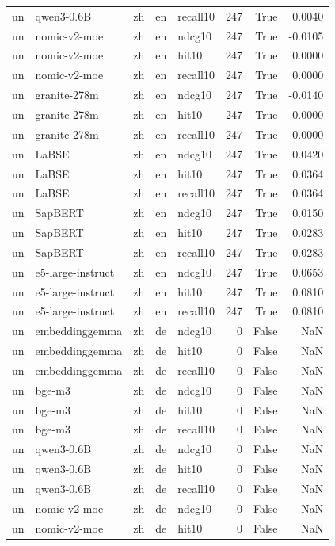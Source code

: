 \begin{tabular}{lllllrrr}
un & qwen3-0.6B & zh & en & recall10 & 247 & True & 0.0040 \\
un & nomic-v2-moe & zh & en & ndcg10 & 247 & True & -0.0105 \\
un & nomic-v2-moe & zh & en & hit10 & 247 & True & 0.0000 \\
un & nomic-v2-moe & zh & en & recall10 & 247 & True & 0.0000 \\
un & granite-278m & zh & en & ndcg10 & 247 & True & -0.0140 \\
un & granite-278m & zh & en & hit10 & 247 & True & 0.0000 \\
un & granite-278m & zh & en & recall10 & 247 & True & 0.0000 \\
un & LaBSE & zh & en & ndcg10 & 247 & True & 0.0420 \\
un & LaBSE & zh & en & hit10 & 247 & True & 0.0364 \\
un & LaBSE & zh & en & recall10 & 247 & True & 0.0364 \\
un & SapBERT & zh & en & ndcg10 & 247 & True & 0.0150 \\
un & SapBERT & zh & en & hit10 & 247 & True & 0.0283 \\
un & SapBERT & zh & en & recall10 & 247 & True & 0.0283 \\
un & e5-large-instruct & zh & en & ndcg10 & 247 & True & 0.0653 \\
un & e5-large-instruct & zh & en & hit10 & 247 & True & 0.0810 \\
un & e5-large-instruct & zh & en & recall10 & 247 & True & 0.0810 \\
un & embeddinggemma & zh & de & ndcg10 & 0 & False & NaN \\
un & embeddinggemma & zh & de & hit10 & 0 & False & NaN \\
un & embeddinggemma & zh & de & recall10 & 0 & False & NaN \\
un & bge-m3 & zh & de & ndcg10 & 0 & False & NaN \\
un & bge-m3 & zh & de & hit10 & 0 & False & NaN \\
un & bge-m3 & zh & de & recall10 & 0 & False & NaN \\
un & qwen3-0.6B & zh & de & ndcg10 & 0 & False & NaN \\
un & qwen3-0.6B & zh & de & hit10 & 0 & False & NaN \\
un & qwen3-0.6B & zh & de & recall10 & 0 & False & NaN \\
un & nomic-v2-moe & zh & de & ndcg10 & 0 & False & NaN \\
un & nomic-v2-moe & zh & de & hit10 & 0 & False & NaN \\

\end{tabular}
